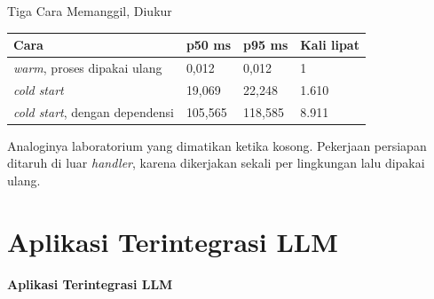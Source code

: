 \documentclass[aspectratio=169, table, 12pt]{beamer}
\begin{document}
\begin{frame}{{\Large Tiga Cara Memanggil, Diukur}}
  \vspace{6pt}
  \centering
  {\footnotesize
  \begin{tabularx}{\textwidth}{Ylll}
    \hline
    \textbf{Cara} & \textbf{p50 ms} & \textbf{p95 ms} & \textbf{Kali lipat} \\
    \hline
    \textit{warm}, proses dipakai ulang & 0,012 & 0,012 & 1 \\
    \hline
    \textit{cold start} & 19,069 & 22,248 & 1.610 \\
    \hline
    \textit{cold start}, dengan dependensi & 105,565 & 118,585 & 8.911 \\
    \hline
  \end{tabularx}}

  \vspace{6pt}
  {\small Analoginya laboratorium yang dimatikan ketika kosong. Pekerjaan
  persiapan ditaruh di luar \textit{handler}, karena dikerjakan sekali per
  lingkungan lalu dipakai ulang.}
\end{frame}

\section{Aplikasi Terintegrasi LLM}

\begin{frame}{\hfill}
  \centering
  \Huge{\textbf{Aplikasi Terintegrasi LLM}}
\end{frame}
\end{document}
